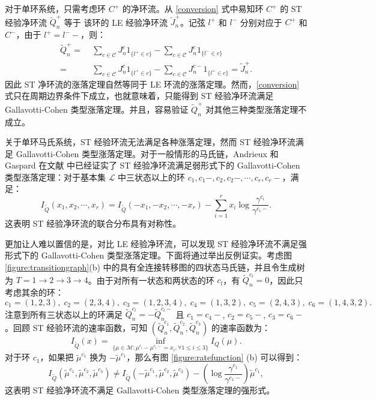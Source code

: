 对于单环系统，只需考虑环 $C^+$ 的净环流。从 \eqref{conversion} 式中易知环 $C^+$ 的 ST 经验净环流  $\tilde{Q}^+_n$ 等于 该环的 LE 经验净环流 $\tilde{J}^+_n$。记弦 $l^+$ 和 $l^-$ 分别对应于 $C^+$ 和 $C^-$，由于 $l^+=l^--$，则：
\begin{equation*}\label{circulation}
    \begin{split}
            \tilde{Q}^{+}_n =&\;\sum_{c\in \mathcal{C}}J^c_n1_{\{l^+\in c \}}-\sum_{c\in \mathcal{C}}J^c_n1_{\{l^-\in c \}}\\
            =&\;\sum_{c\in \mathcal{C}}J^c_n1_{\{l^+\in c \}}-\sum_{c\in \mathcal{C}}J^{c-}_n1_{\{l^+\in c \}} = \tilde{J}^+_n.
    \end{split}
\end{equation*}
因此 ST 净环流的涨落定理自然等同于 LE 环流的涨落定理。然而，\eqref{conversion} 式只在周期边界条件下成立，也就意味着，只能得到 ST 经验净环流满足 Gallavotti-Cohen 类型涨落定理。并且，容易验证 $\tilde{Q}^+_n$ 对其他三种类型涨落定理不成立。



关于单环马氏系统，ST 经验环流无法满足各种涨落定理，然而 ST 经验净环流满足 Gallavotti-Cohen 类型涨落定理。对于一般情形的马氏链，Andrieux 和 Gaspard 在文献 \cite{andrieux2007fluctuation} 中已经证实了 ST 经验净环流满足弱形式下的 Gallavotti-Cohen 类型涨落定理：对于基本集 $\mathcal{L}$ 中三状态以上的环  $c_1,c_1-,c_2,c_2-,\cdots,c_r,c_r-$，满足：
\begin{equation*}
I_{\tilde{Q}}(x_1,x_2,\cdots,x_r)
= I_{\tilde{Q}}(-x_1,-x_2,\cdots,-x_r)
-\sum_{i=1}^rx_i\log\frac{\gamma^{c_i}}{\gamma^{c_i-}}.
\end{equation*}
这表明 ST 经验净环流的联合分布具有对称性。

更加让人难以置信的是，对比 LE 经验净环流，可以发现 ST 经验净环流不满足强形式下的 Gallavotti-Cohen 类型涨落定理。下面将通过举出反例证实。考虑图 \ref{figure:transitiongraph}(b) 中的具有全连接转移图的四状态马氏链，并且令生成树为 $T=1\to2\to3\to4$。由于对所有一状态和两状态的环 $c_l$，有 $\tilde{Q}^{c_l}_n=0$，因此只考虑其余的环：
\begin{equation*}
	c_1 = (1,2,3),\;c_2 = (2,3,4),\;c_3 = (1,2,3,4),\;c_4 = (1,3,2),\;
	c_5 = (2,4,3),\;c_6 = (1,4,3,2).
\end{equation*}
注意到所有三状态以上的环满足 $\tilde{Q}^{c_l}_n=-\tilde{Q}^{c_l-}_n$ 且 $c_1=c_4-$, $c_2=c_5-$, $c_3=c_6-$。回顾 ST 经验环流的速率函数，可知 $(\tilde{Q}^{c_1}_n,\tilde{Q}^{c_2}_n,\tilde{Q}^{c_3}_n)$ 的速率函数为：
\begin{equation*}
	I_{\tilde{Q}}(x)=\inf_{\{\mu\in\mathcal{M}:\mu^{c_i}-\mu^{c_i-}= x_i,\forall 1\le i\le 3\}}I_Q(\mu).
\end{equation*}
对于环 $c_1$，如果把 $\tilde{\mu}^{c_1}$ 换为 $-\tilde{\mu}^{c_1}$，那么有图 \ref{figure:ratefunction} (b) 可以得到：
\begin{equation*}
I_{\tilde{Q}}(\tilde{\mu}^{c_1},\tilde{\mu}^{c_2},\tilde{\mu}^{c_3})\neq I_{\tilde{Q}}(-\tilde{\mu}^{c_1},\tilde{\mu}^{c_2},\tilde{\mu}^{c_3})
-\left(\log\frac{\gamma^{c_1}}{\gamma^{c_1-}}\right)\tilde{\mu}^{c_1},
\end{equation*}
这表明 ST 经验净环流不满足 Gallavotti-Cohen 类型涨落定理的强形式。